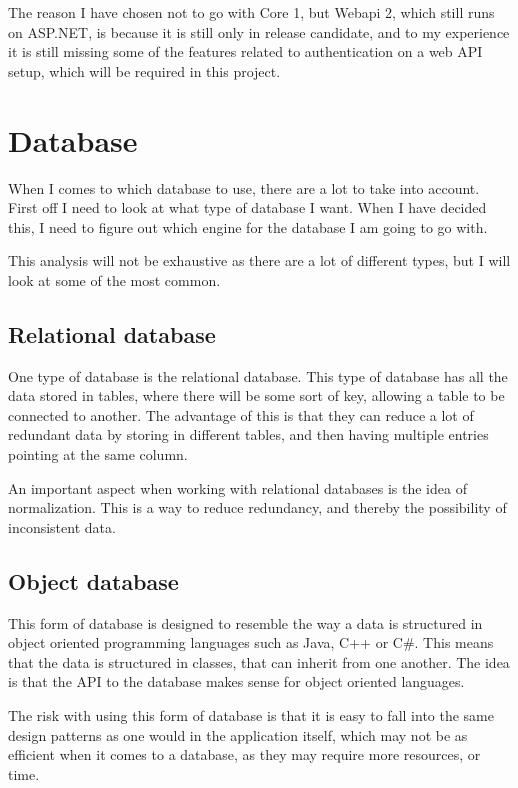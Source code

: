 The reason I have chosen not to go with Core 1, but Webapi 2, which still runs
on ASP.NET, is because it is still only in release
candidate\cite{asp_core_1:roadmap}, and to my experience it is still missing
some of the features related to authentication on a web API setup, which will be
required in this project. 

\section{Database }
\label{sec:Database_engine}
When I comes to which database to use, there are a lot to take into account.
First off I need to look at what type of database I want. When I have decided
this, I need to figure out which engine for the database I am going to go with.

This analysis will not be exhaustive as there are a lot of different types, but
I will look at some of the most common. 

\subsection{Relational database}
\label{sub:Relational database}
One type of database is the relational database. This type of database has all
the data stored in tables, where there will be some sort of key, allowing a
table to be connected to another. The advantage of this is that they can reduce
a lot of redundant data by storing in different tables, and then having multiple
entries pointing at the same column\cite{ibm:choosing_dbms}. 

An important aspect when working with relational databases is the idea of
normalization. This is a way to reduce redundancy, and thereby the possibility
of inconsistent data. 

\subsection{Object database}
\label{sub:Object database}
This form of database is designed to resemble the way a data is structured in
object oriented programming languages such as Java, C++ or C\#. This means that
the data is structured in classes, that can inherit from one another. The idea
is that the API to the database makes sense for object oriented languages. 

The risk with using this form of database is that it is easy to fall into the
same design patterns as one would in the application itself, which may not be as
efficient when it comes to a database, as they may require more resources, or
time\cite{ibm:choosing_dbms}. 

